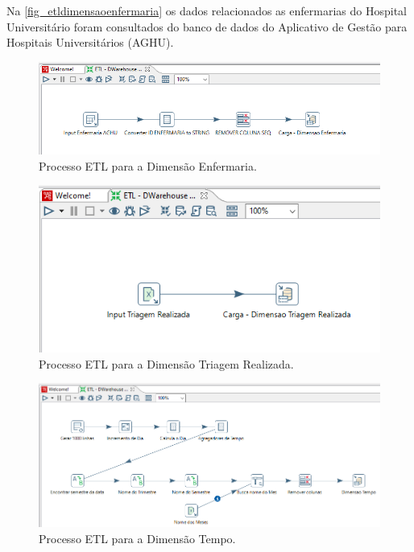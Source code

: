 Na \autoref{fig_etldimensaoenfermaria} os dados relacionados as enfermarias do Hospital Universitário foram consultados do banco de dados do Aplicativo de Gestão para Hospitais Universitários (AGHU). 
\begin{figure}[htb]
	\caption{\label{fig_etldimensaoenfermaria}Processo ETL para a Dimensão Enfermaria.}
	\begin{center}
	    \includegraphics[scale=0.7]{Imagens/figura - etl dw enfermaria.png}
	\end{center}
\end{figure}

\begin{figure}[htb]
	\caption{\label{fig_etldimensaotriagem}Processo ETL para a Dimensão Triagem Realizada.}
	\begin{center}
	    \includegraphics[scale=0.64]{Imagens/figura - etl dw triagem.png}
	\end{center}
\end{figure}

\begin{figure}[htb]
	\caption{\label{fig_etldimensaotempo}Processo ETL para a Dimensão Tempo.}
	\begin{center}
	    \includegraphics[scale=0.6]{Imagens/figura - etl dw tempo.png}
	\end{center}
\end{figure}

